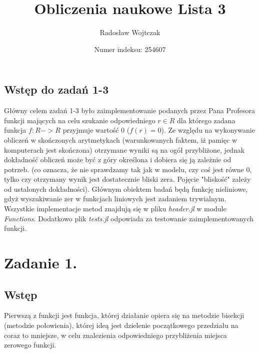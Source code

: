 \documentclass[a4paper,14pt]{report}
\title{Obliczenia naukowe Lista 3}
\author{Radosław Wojtczak}
\date{Numer indeksu: 254607}
\begin{document}
\maketitle
\tableofcontents


\section{Wstęp do zadań 1-3}
  Główny celem zadań 1-3 było zaimplementowanie podanych przez Pana Profesora funkcji mających na celu szukanie odpowiedniego $r \in R$ dla którego zadana funkcja $f:R->R$ przyjmuje wartość 0 ($f(r)=0$). Ze względu na wykonywanie obliczeń w skończonych arytmetykach (warunkowanych faktem, iż pamięc w komputerach jest skończona) otrzymane wyniki są na ogół przybliżone, jednak dokładność obliczeń może być z góry określona i dobiera się ją zależnie od potrzeb. (co oznacza, że nie sprawdzamy tak jak w modelu, czy coś jest równe 0, tylko czy otrzymany wynik jest dostatecznie bliski zera. Pojęcie "bliskość" zależy od ustalonych dokładności). Głównym obiektem badań będą funkcję nieliniowe, gdyż wyszukiwanie zer w funkcjach liniowych jest zadaniem trywialnym. \\
  Wszystkie implementacje metod znajdują się w pliku \textit{header.jl} w module \textit{Functions}. Dodatkowo plik \textit{tests.jl} odpowiada za testowanie zaimplementowanych funkcji.
\chapter{Zadanie 1.}
  \section{Wstęp}
  Pierwszą z funkcji jest funkcja, której działanie opiera się na metodzie bisekcji (metodzie połowienia), której ideą jest dzielenie początkowego przedziału na coraz to mniejsze, w celu znalezienia odpowiedniego przybliżenia miejsca zerowego funkcji. 
\end{document}
